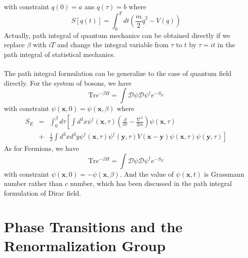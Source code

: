 with constraint $q(0) = a$ ans $q(\tau) = b$
where
\[S[q(t)] = \int_0^{T} dt \left(\frac{m}{2}\dot{q}^2 - V(q) \right)\]
Actually, path integral of quantum mechanics can be obtained directly if we replace $\beta$ with $iT$ and change the integral variable from $\tau$ to $t$ by $\tau = it$ in the path integral  of statistical mechanics.
\\ \\
The path integral formulation can be generalize to the case of quantum field directly. For the system of bosons, we have
\[\mathrm{Tr}e^{-\beta H} = \int \mathcal{D}\psi \mathcal{D}\psi^{\dagger} e^{-S_E}\]
with constraint $\psi(\bm{x},0) = \psi(\bm{x},\beta)$
where
\begin{eqnarray}
S_E &=& \int_0^{\beta}d\tau \left[ \int d^3x \psi^{\dagger}(\bm{x},\tau) \left( \frac{\partial}{\partial \tau} - \frac{\nabla^2}{2m} \right) \psi(\bm{x},\tau) \right. \nonumber \\
&+& \left. \frac{1}{2}\int d^3x d^3y\psi^{\dagger}(\bm{x},\tau)\psi^{\dagger}(\bm{y},\tau)V(\bm{x}-\bm{y})\psi(\bm{x},\tau)\psi(\bm{y},\tau) \right] \nonumber
\end{eqnarray}
As for Fermions, we have
\[\mathrm{Tr}e^{-\beta H} = \int \mathcal{D}\psi \mathcal{D}\psi^{\dagger} e^{-S_E}\]
with constraint $\psi(\bm{x},0) = -\psi(\bm{x},\beta)$. 
And the value of $\psi(\bm{x},t)$ is Grassmann number rather than $c$ number, which has been discussed in the path integral formulation of Dirac field.

\chapter{Phase Transitions and the Renormalization Group}
